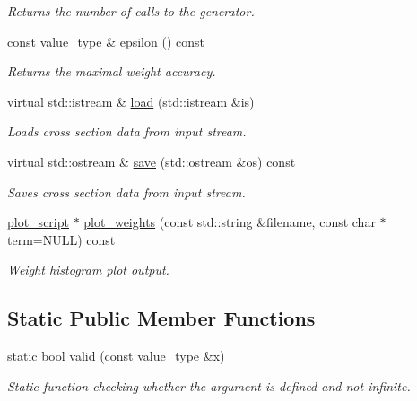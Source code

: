 \begin{DoxyCompactItemize}
\begin{DoxyCompactList}\small\item\em Returns the number of calls to the generator. \end{DoxyCompactList}\item 
\hypertarget{a00362_a752d3be5799ad2218236bd83a2b1f637}{const \hyperlink{a00362_a3353150105036deac9bde097cbf1d8af}{value\-\_\-type} \& \hyperlink{a00362_a752d3be5799ad2218236bd83a2b1f637}{epsilon} () const }\label{a00362_a752d3be5799ad2218236bd83a2b1f637}

\begin{DoxyCompactList}\small\item\em Returns the maximal weight accuracy. \end{DoxyCompactList}\item 
\hypertarget{a00362_a79f77d0af650bca5b8b118a7967b1f45}{virtual std\-::istream \& \hyperlink{a00362_a79f77d0af650bca5b8b118a7967b1f45}{load} (std\-::istream \&is)}\label{a00362_a79f77d0af650bca5b8b118a7967b1f45}

\begin{DoxyCompactList}\small\item\em Loads cross section data from input stream. \end{DoxyCompactList}\item 
\hypertarget{a00362_a5baa3e9442ca36c89a8224f0f447cf0f}{virtual std\-::ostream \& \hyperlink{a00362_a5baa3e9442ca36c89a8224f0f447cf0f}{save} (std\-::ostream \&os) const }\label{a00362_a5baa3e9442ca36c89a8224f0f447cf0f}

\begin{DoxyCompactList}\small\item\em Saves cross section data from input stream. \end{DoxyCompactList}\item 
\hyperlink{a00426}{plot\-\_\-script} $\ast$ \hyperlink{a00362_ad74b8d641deed440426100bef4577ff4}{plot\-\_\-weights} (const std\-::string \&filename, const char $\ast$term=N\-U\-L\-L) const 
\begin{DoxyCompactList}\small\item\em Weight histogram plot output. \end{DoxyCompactList}\end{DoxyCompactItemize}
\subsection*{Static Public Member Functions}
\begin{DoxyCompactItemize}
\item 
static bool \hyperlink{a00362_a93b1a9d5d40422ff6478b458c4453a47}{valid} (const \hyperlink{a00362_a3353150105036deac9bde097cbf1d8af}{value\-\_\-type} \&x)
\begin{DoxyCompactList}\small\item\em Static function checking whether the argument is defined and not infinite. \end{DoxyCompactList}\end{DoxyCompactItemize}
